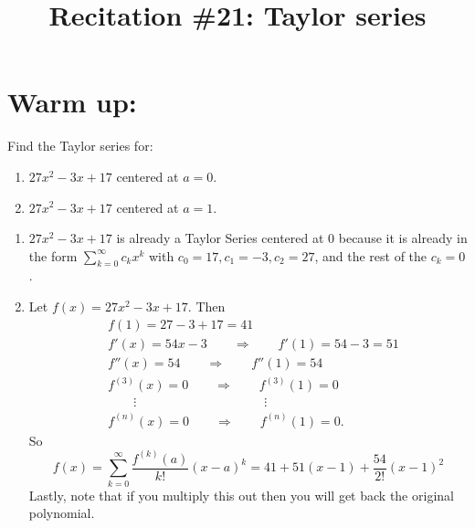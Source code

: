 \documentclass[noinstructornotes]{ximera}
\title{Recitation \#21: Taylor series}
\begin{document}
\begin{abstract}		\end{abstract}
\maketitle



\section{Warm up:}
Find the Taylor series for:  
	\begin{enumerate}
	\item $27x^2 - 3x + 17$ centered at $a=0$.  
	\item  $27x^2 - 3x + 17$ centered at $a=1$.  
	\end{enumerate}
	
	\begin{freeResponse}
	\begin{enumerate}
	\item
	$27x^2 - 3x + 17$ is already a Taylor Series centered at 0 because it is already in the form $\sum_{k=0}^\infty c_k x^k$ with $c_0=17, c_1=-3, c_2=27$, and the rest of the $c_k=0$.
	
	\item  
	Let $f(x) = 27x^2-3x+17$.  Then
		\begin{align*}
		&f(1) = 27 - 3 + 17 = 41  \\
		&f'(x) = 54x - 3 	\qquad \Longrightarrow 	\qquad	f'(1) = 54-3=51  \\
		&f''(x) = 54 		\qquad	\Longrightarrow	\qquad f''(1) = 54  \\
		&f^{(3)}(x) = 0 	\qquad	\Longrightarrow	\qquad f^{(3)}(1) = 0  \\
		&\qquad \vdots 	\qquad	\qquad	\qquad \qquad \qquad	\vdots  \\
		&f^{(n)}(x) = 0	\qquad	\Longrightarrow	\qquad	f^{(n)}(1) = 0.
		\end{align*}
	So
		\[
		f(x) = \sum_{k=0}^\infty \frac{f^{(k)}(a)}{k!}(x-a)^k = \boxed{41 + 51(x-1) + \frac{54}{2!}(x-1)^2}
		\]
	Lastly, note that if you multiply this out then you will get back the original polynomial.
	
	
	

	
	\end{enumerate}
	\end{freeResponse}
	
\end{document}
